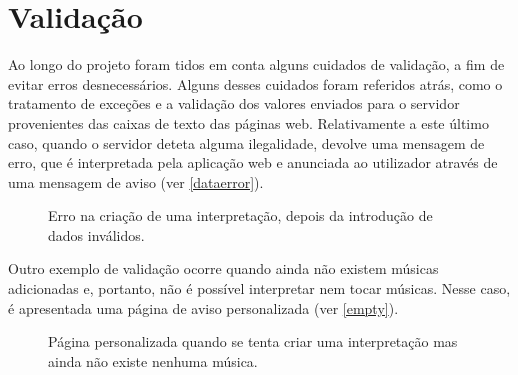 \documentclass{report}
\begin{document}












\chapter{Validação}
\label{chap.validacao}
Ao longo do projeto foram tidos em conta alguns cuidados de validação, a fim de evitar erros desnecessários. Alguns desses cuidados foram referidos atrás, como o tratamento de exceções e a validação dos valores enviados para o servidor provenientes das caixas de texto das páginas web. Relativamente a este último caso, quando o servidor deteta alguma ilegalidade, devolve uma mensagem de erro, que é interpretada pela aplicação web e anunciada ao utilizador através de uma mensagem de aviso (ver \autoref{dataerror}).

\begin{figure}[htp]
\centering
{}
\caption{Erro na criação de uma interpretação, depois da introdução de dados inválidos.}
\label{dataerror}
\end{figure}

Outro exemplo de validação ocorre quando ainda não existem músicas adicionadas e, portanto, não é possível interpretar nem tocar músicas. Nesse caso, é apresentada uma página de aviso personalizada (ver \autoref{empty}).

\begin{figure}[htp]
\centering
{}
\caption{Página personalizada quando se tenta criar uma interpretação mas ainda não existe nenhuma música.}
\label{empty}
\end{figure}
\end{document}
